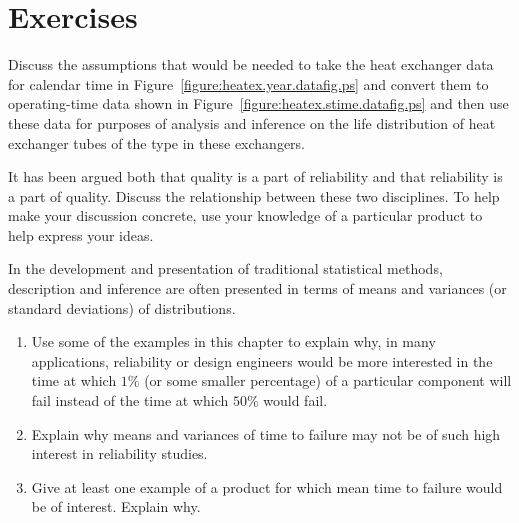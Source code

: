 \section*{Exercises}

\begin{exercise}
Discuss the assumptions that would be needed to take the heat
exchanger data for calendar time in
Figure~\ref{figure:heatex.year.datafig.ps} and convert them to
operating-time data shown in
Figure~\ref{figure:heatex.stime.datafig.ps} and then use these data
for purposes of analysis and inference on the life distribution of
heat exchanger tubes of the type in these exchangers.
\end{exercise}

\begin{exercise}
It has been argued both that quality is a part of reliability and that
reliability is a part of quality. Discuss the relationship between
these two disciplines. To help make your discussion concrete, use your
knowledge of a particular product to help express your ideas.
\end{exercise}

\begin{exercise}
In the development and presentation of traditional statistical
methods, description and inference are often presented in terms of
means and variances (or standard deviations) of distributions.
\begin{enumerate}
\item
Use some of the examples in this chapter to explain why, in many
applications, reliability or design engineers would be more interested
in the time at which $1\%$ (or some smaller percentage) of a
particular component will fail instead of the time at which $50\%$
would fail.
\item
Explain why means and variances of time to failure may not be of such
high interest in reliability studies.
\item
Give at least one example of a product for which mean time to failure
would be of interest. Explain why.
\end{enumerate}
\end{exercise}


